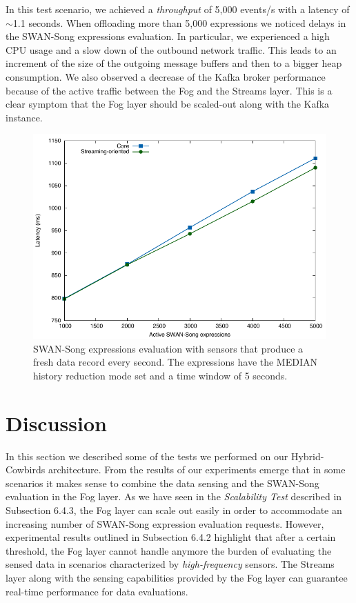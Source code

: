 In this test scenario, we achieved a \emph{throughput} of 5,000 events/s with a latency of $\sim$1.1 seconds. When offloading more than 5,000 expressions we noticed delays in the SWAN-Song expressions evaluation. In particular, we experienced a high CPU usage and a slow down of the outbound network traffic. This leads to an increment of the size of the outgoing message buffers and then to a bigger heap consumption. We also observed a decrease of the Kafka broker performance because of the active traffic between the Fog and the Streams layer. This is a clear symptom that the Fog layer should be scaled-out along with the Kafka instance. 
 \begin{figure}[h!]
\includegraphics[width=1\textwidth]{images/1f_MEDIAN.pdf}
 \caption{SWAN-Song expressions evaluation with sensors that produce a fresh data record every second. The expressions have the MEDIAN history reduction mode set and a time window of 5 seconds.}
\label{fig:1_0_median}
\end{figure}


\section{Discussion}
In this section we described some of the tests we performed on our Hybrid-Cowbirds architecture. From the results of our experiments emerge that in some scenarios it makes sense to combine the data sensing and  the SWAN-Song evaluation in the Fog layer. As we have seen in the \emph{Scalability Test} described in Subsection 6.4.3, the Fog layer can scale out easily in order to accommodate an increasing number of SWAN-Song expression evaluation requests. However, experimental results outlined in Subsection 6.4.2 highlight that after a certain threshold, the Fog layer cannot handle anymore the burden of evaluating the sensed data in scenarios characterized by \emph{high-frequency} sensors.
The Streams layer along with the sensing capabilities provided by the Fog layer can guarantee real-time performance for data evaluations.

